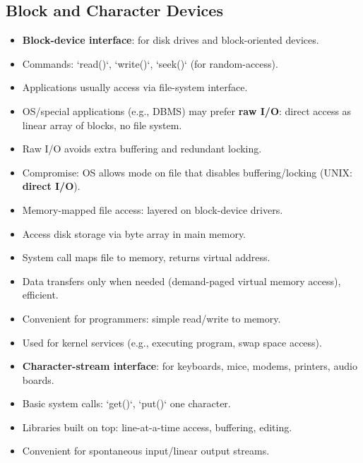 \subsection{Block and Character Devices}
\begin{itemize}
    \item \textbf{Block-device interface}: for disk drives and block-oriented devices.
    \item Commands: `read()`, `write()`, `seek()` (for random-access).
    \item Applications usually access via file-system interface.
    \item OS/special applications (e.g., DBMS) may prefer \textbf{raw I/O}: direct access as linear array of blocks, no file system.
    \item Raw I/O avoids extra buffering and redundant locking.
    \item Compromise: OS allows mode on file that disables buffering/locking (UNIX: \textbf{direct I/O}).
    \item Memory-mapped file access: layered on block-device drivers.
    \item Access disk storage via byte array in main memory.
    \item System call maps file to memory, returns virtual address.
    \item Data transfers only when needed (demand-paged virtual memory access), efficient.
    \item Convenient for programmers: simple read/write to memory.
    \item Used for kernel services (e.g., executing program, swap space access).
    \item \textbf{Character-stream interface}: for keyboards, mice, modems, printers, audio boards.
    \item Basic system calls: `get()`, `put()` one character.
    \item Libraries built on top: line-at-a-time access, buffering, editing.
    \item Convenient for spontaneous input/linear output streams.
\end{itemize}

